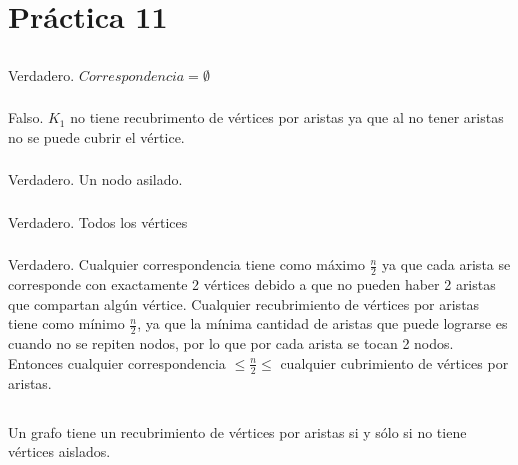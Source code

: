 \section{Práctica 11}

\setcounter{subsection}{1}
\subsection{}
\subsubsection{}
Verdadero. $Correspondencia = \emptyset$

\subsubsection{}
Falso. $K_1$ no tiene recubrimento de vértices por aristas ya que al no tener
aristas no se puede cubrir el vértice.

\subsubsection{}
Verdadero. Un nodo asilado.

\subsubsection{}
Verdadero. Todos los vértices

\subsubsection{}
Verdadero. Cualquier correspondencia tiene como máximo $\frac{n}{2}$ ya que
cada arista se corresponde con exactamente 2 vértices debido a que no pueden
haber 2 aristas que compartan algún vértice. Cualquier recubrimiento de
vértices por aristas tiene como mínimo $\frac{n}{2}$, ya que la mínima
cantidad de aristas que puede lograrse es cuando no se repiten nodos, por lo
que por cada arista se tocan 2 nodos. Entonces cualquier correspondencia
$\leq \frac{n}{2} \leq$ cualquier cubrimiento de vértices por aristas.

\subsection{}
\subsubsection{}
Un grafo tiene un recubrimiento de vértices por aristas si y sólo si no
tiene vértices aislados.

